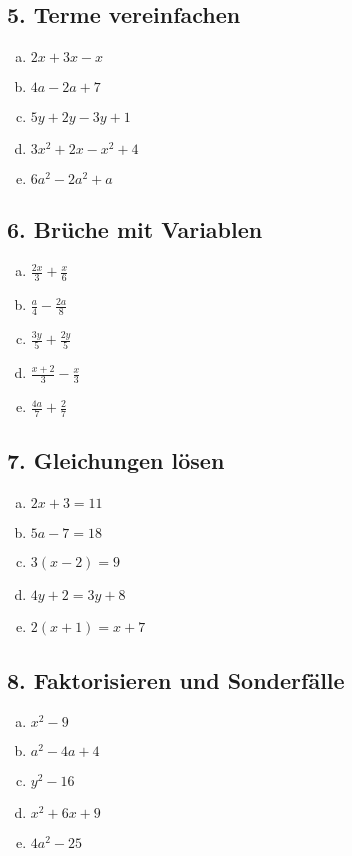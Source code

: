 \subsection*{5. Terme vereinfachen}
\begin{enumerate}[a)]
    \item $2x + 3x - x$
    \item $4a - 2a + 7$
    \item $5y + 2y - 3y + 1$
    \item $3x^2 + 2x - x^2 + 4$
    \item $6a^2 - 2a^2 + a$
\end{enumerate}

\subsection*{6. Brüche mit Variablen}
\begin{enumerate}[a)]
    \item $\frac{2x}{3} + \frac{x}{6}$
    \item $\frac{a}{4} - \frac{2a}{8}$
    \item $\frac{3y}{5} + \frac{2y}{5}$
    \item $\frac{x+2}{3} - \frac{x}{3}$
    \item $\frac{4a}{7} + \frac{2}{7}$
\end{enumerate}

\subsection*{7. Gleichungen lösen}
\begin{enumerate}[a)]
    \item $2x + 3 = 11$
    \item $5a - 7 = 18$
    \item $3(x-2) = 9$
    \item $4y + 2 = 3y + 8$
    \item $2(x+1) = x + 7$
\end{enumerate}

\subsection*{8. Faktorisieren und Sonderfälle}
\begin{enumerate}[a)]
    \item $x^2 - 9$
    \item $a^2 - 4a + 4$
    \item $y^2 - 16$
    \item $x^2 + 6x + 9$
    \item $4a^2 - 25$
\end{enumerate}


